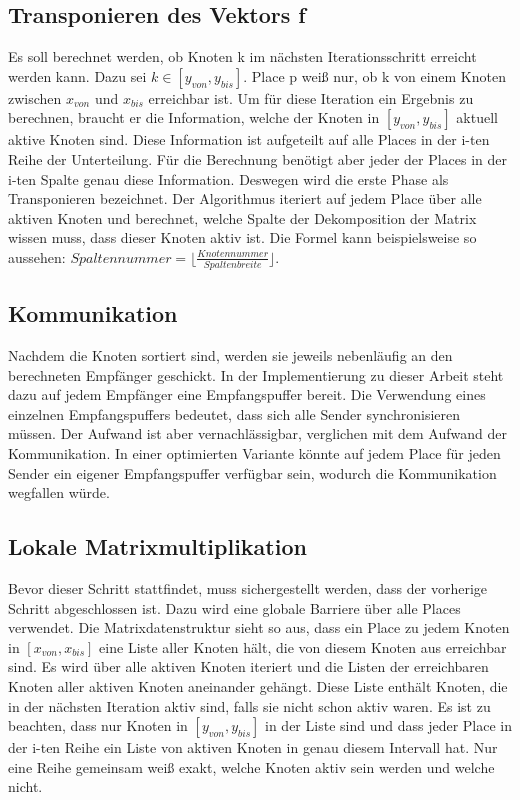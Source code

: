 \subsection{Transponieren des Vektors f} %
\label{sub:transponieren_des_vektors_f}
Es soll berechnet werden, ob Knoten k im nächsten Iterationsschritt erreicht werden kann. Dazu sei $k \in \left[y_{von}, y_{bis} \right]$. Place p weiß nur, ob k von einem Knoten zwischen $x_{von}$ und $x_{bis}$ erreichbar ist. Um für diese Iteration ein Ergebnis zu berechnen, braucht er die Information, welche der Knoten in $\left[y_{von}, y_{bis} \right]$ aktuell aktive Knoten sind. Diese Information ist aufgeteilt auf alle Places in der i-ten Reihe der Unterteilung. Für die Berechnung benötigt aber jeder der Places in der i-ten Spalte genau diese Information. Deswegen wird die erste Phase als Transponieren bezeichnet. Der Algorithmus iteriert auf jedem Place über alle aktiven Knoten und berechnet, welche Spalte der Dekomposition der Matrix wissen muss, dass dieser Knoten aktiv ist. Die Formel kann beispielsweise so aussehen: $\mathit{Spaltennummer}= \lfloor\frac{\mathit{Knotennummer}}{\mathit{Spaltenbreite}}\rfloor$. 

\subsection{Kommunikation} %
\label{ssub:kommunikation}
Nachdem die Knoten sortiert sind, werden sie jeweils nebenläufig an den berechneten Empfänger geschickt. In der Implementierung zu dieser Arbeit steht dazu auf jedem Empfänger eine Empfangspuffer bereit. Die Verwendung eines einzelnen Empfangspuffers bedeutet, dass sich alle Sender synchronisieren müssen. Der Aufwand ist aber vernachlässigbar, verglichen mit dem Aufwand der Kommunikation. In einer optimierten Variante könnte auf jedem Place für jeden Sender ein eigener Empfangspuffer verfügbar sein, wodurch die Kommunikation wegfallen würde.

\subsection{Lokale Matrixmultiplikation} %
\label{ssub:lokale_matrixmultiplikation}
Bevor dieser Schritt stattfindet, muss sichergestellt werden, dass der vorherige Schritt abgeschlossen ist. Dazu wird eine globale Barriere über alle Places verwendet. Die Matrixdatenstruktur sieht so aus, dass ein Place zu jedem Knoten in $\left[x_{von}, x_{bis} \right]$ eine Liste aller Knoten hält, die von diesem Knoten aus erreichbar sind. Es wird über alle aktiven Knoten iteriert und die Listen der erreichbaren Knoten aller aktiven Knoten aneinander gehängt. Diese Liste enthält Knoten, die in der nächsten Iteration aktiv sind, falls sie nicht schon aktiv waren. Es ist zu beachten, dass nur Knoten in $\left[y_{von}, y_{bis} \right]$ in der Liste sind und dass jeder Place in der i-ten Reihe ein Liste von aktiven Knoten in genau diesem Intervall hat. Nur eine Reihe gemeinsam weiß exakt, welche Knoten aktiv sein werden und welche nicht.

